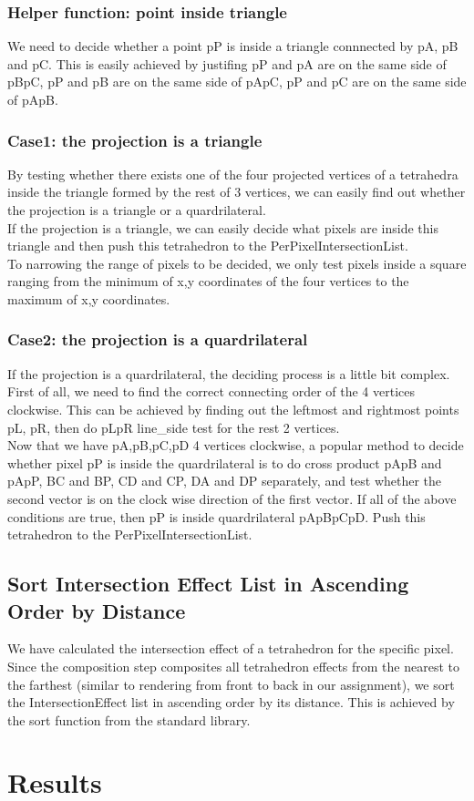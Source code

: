 \documentclass[acmtog]{acmart}
\begin{document}
\subsubsection{Helper function: point inside triangle}
We need to decide whether a point pP is inside a triangle connnected by pA, pB and pC. This is easily achieved by justifing pP and pA are on the same side of pBpC, pP and pB are on the same side of pApC, pP and pC are on the same side of pApB.
\\
\subsubsection{Case1: the projection is a triangle}
By testing whether there exists one of the four projected vertices of a tetrahedra inside the triangle formed by the rest of 3 vertices, we can easily find out whether the projection is a triangle or a quardrilateral.
\\If the projection is a triangle, we can easily decide what pixels are inside this triangle and then push this tetrahedron to the PerPixelIntersectionList.
\\To narrowing the range of pixels to be decided, we only test pixels inside a square ranging from the minimum of x,y coordinates of the four vertices to the maximum of x,y coordinates.
\\
\subsubsection{Case2: the projection is a quardrilateral}
If the projection is a quardrilateral, the deciding process is a little bit complex. First of all, we need to find the correct connecting order of the 4 vertices clockwise. This can be achieved by finding out the leftmost and rightmost points pL, pR, then do pLpR line_side test for the rest 2 vertices.
\\Now that we have pA,pB,pC,pD 4 vertices clockwise, a popular method to decide whether pixel pP is inside the quardrilateral is to do cross product pApB and pApP, BC and BP, CD and CP, DA and DP separately, and test whether the second vector is on the clock wise direction of the first vector. If all of the above conditions are true, then pP is inside quardrilateral pApBpCpD. Push this tetrahedron to the PerPixelIntersectionList.
\\
\subsection{Sort Intersection Effect List in Ascending Order by Distance}
We have calculated the intersection effect of a tetrahedron for the specific pixel. Since the composition step composites all tetrahedron effects from the nearest to the farthest (similar to rendering from front to back in our assignment), we sort the IntersectionEffect list in ascending order by its distance. This is achieved by the sort function from the standard library.
\\




\section{Results}
\end{document}
